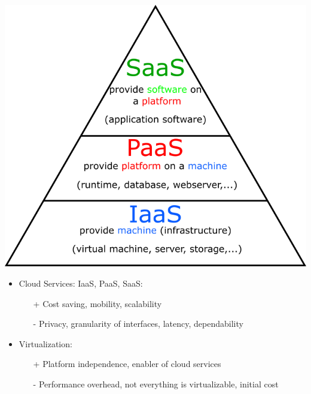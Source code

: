 \documentclass[
    ../../Software_Engineering_Summary.tex,
]
{subfiles}
\begin{document}
\begin{defbox}
	\begin{minipage}
        [c]{0.4\textwidth}
        \centering
        \includegraphics[width = \textwidth]{Pics/12/SoftwareArchitecture.png}
    \end{minipage}
    \begin{minipage}
        [c]{0.6\textwidth}
        \begin{itemize}
            \item Cloud Services: IaaS, PaaS, SaaS:
            \begin{itemize}
                \item[+] \color{codegreen}Cost saving, mobility, scalability\color{black}
                \item[-] \color{codered}Privacy, granularity of interfaces, latency, dependability \color{black}
            \end{itemize}
            \item Virtualization:
            \begin{itemize}
                \item[+] \color{codegreen} Platform independence, enabler of cloud services\color{black}
                \item[-] \color{codered} Performance overhead, not everything is virtualizable, initial cost \color{black}
            \end{itemize}
        \end{itemize}
    \end{minipage}
\end{defbox}
\end{document}
